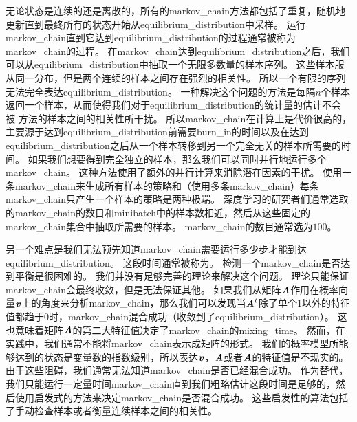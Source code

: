 无论状态是连续的还是离散的，所有的\gls{markov_chain}方法都包括了重复，随机地更新直到最终所有的状态开始从\gls{equilibrium_distribution}中采样。 %
运行\gls{markov_chain}直到它达到\gls{equilibrium_distribution}的过程通常被称为\gls{markov_chain}的过程。
在\gls{markov_chain}达到\gls{equilibrium_distribution}之后，我们可以从\gls{equilibrium_distribution}中抽取一个无限多数量的样本序列。 
这些样本服从同一分布，但是两个连续的样本之间存在强烈的相关性。 
所以一个有限的序列无法完全表达\gls{equilibrium_distribution}。
一种解决这个问题的方法是每隔$n$个样本返回一个样本，从而使得我们对于\gls{equilibrium_distribution}的统计量的估计不会被\,\,方法的样本之间的相关性所干扰。
所以\gls{markov_chain}在计算上是代价很高的，主要源于达到\gls{equilibrium_distribution}前需要\gls{burn_in}的时间以及在达到\gls{equilibrium_distribution}之后从一个样本转移到另一个完全无关的样本所需要的时间。
如果我们想要得到完全独立的样本，那么我们可以同时并行地运行多个\gls{markov_chain}。  
这种方法使用了额外的并行计算来消除潜在因素的干扰。 
使用一条\gls{markov_chain}来生成所有样本的策略和（使用多条\gls{markov_chain}）每条\gls{markov_chain}只产生一个样本的策略是两种极端。
深度学习的研究者们通常选取的\gls{markov_chain}的数目和\gls{minibatch}中的样本数相近，然后从这些固定的\gls{markov_chain}集合中抽取所需要的样本。 
\gls{markov_chain}的数目通常选为$100$。

另一个难点是我们无法预先知道\gls{markov_chain}需要运行多少步才能到达\gls{equilibrium_distribution}。 
这段时间通常被称为。
检测一个\gls{markov_chain}是否达到平衡是很困难的。
我们并没有足够完善的理论来解决这个问题。
理论只能保证\gls{markov_chain}会最终收敛，但是无法保证其他。
如果我们从矩阵$\boldsymbol{\mathit{A}}$作用在概率向量$\boldsymbol{\mathit{v}}$上的角度来分析\gls{markov_chain}，那么我们可以发现当$\boldsymbol{\mathit{A}}^t$除了单个$1$以外的特征值都趋于$0$时，\gls{markov_chain}混合成功（收敛到了\gls{equilibrium_distribution}）。
这也意味着矩阵$\boldsymbol{\mathit{A}}$的第二大特征值决定了\gls{markov_chain}的\gls{mixing_time}。
然而，在实践中，我们通常不能将\gls{markov_chain}表示成矩阵的形式。 
我们的概率模型所能够达到的状态是变量数的指数级别，所以表达$\boldsymbol{\mathit{v}}$，$\boldsymbol{\mathit{A}}$或者$\boldsymbol{\mathit{A}}$的特征值是不现实的。 
由于这些阻碍，我们通常无法知道\gls{markov_chain}是否已经混合成功。
作为替代，我们只能运行一定量时间\gls{markov_chain}直到我们粗略估计这段时间是足够的，然后使用启发式的方法来决定\gls{markov_chain}是否混合成功。
这些启发性的算法包括了手动检查样本或者衡量连续样本之间的相关性。 %




